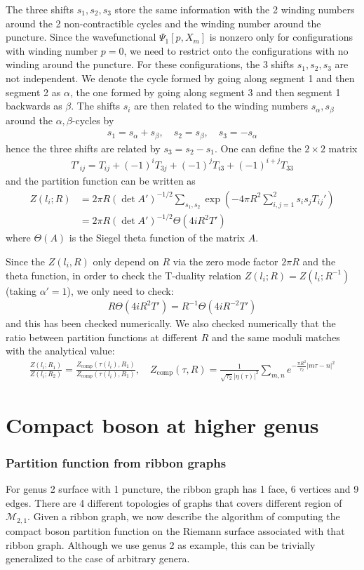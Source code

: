 \documentclass[12pt,letterpaper]{article}
\def\ie{\begin{equation}\begin{aligned}}
\def\fe{\end{aligned}\end{equation}}
\numberwithin{equation}{section}
\begin{document}
The three shifts $s_1, s_2, s_3$ store the same information with the 2 winding numbers around the 2 non-contractible cycles and the winding number around the puncture. Since the wavefunctional $\Psi_1[p,X_m]$ is nonzero only for configurations with winding number $p=0$, we need to restrict onto the configurations with no winding around the puncture. For these configurations, the 3 shifts $s_1, s_2, s_3$ are not independent. We denote the cycle formed by going along segment 1 and then segment 2 as $\alpha$, the one formed by going along segment 3 and then segment 1 backwards as $\beta$. The shifts $s_i$ are then related to the winding numbers $s_\alpha, s_\beta$ around the $\alpha, \beta$-cycles by
\ie
s_1=s_\alpha+s_\beta,\quad s_2=s_\beta, \quad s_3=-s_\alpha
\fe
hence the three shifts are related by $s_3=s_2-s_1$. One can define the $2\times 2$ matrix
\ie
T'_{ij}=T_{ij}+(-1)^i T_{3j}+(-1)^j T_{i3}+(-1)^{i+j} T_{33}
\fe
and the partition function can be written as
\ie
Z(l_i;R)&=2\pi R(\det A')^{-1/2}\sum_{s_1, s_2}\exp(-4\pi R^2\sum_{i,j=1}^2s_is_j T_{ij}')\\
&=2\pi R(\det A')^{-1/2}\Theta(4iR^2 T')
\fe
where $\Theta(A)$ is the Siegel theta function of the matrix $A$. 

Since the $Z(l_i, R)$ only depend on $R$ via the zero mode factor $2\pi R$ and the theta function, in order to check the T-duality relation $Z(l_i;R)=Z(l_i;R^{-1})$ (taking $\alpha'=1$), we only need to check:
\ie
R\Theta(4i R^2 T')= R^{-1}\Theta(4i R^{-2} T')
\fe
and this has been checked numerically. We also checked numerically that the ratio between partition functions at different $R$ and the same moduli matches with the analytical value:
\ie
\frac{Z(l_i; R_1)}{Z(l_i;R_2)}=\frac{Z_\text{comp}(\tau(l_i),R_1)}{Z_\text{comp}(\tau(l_i),R_1)},\quad Z_\text{comp}(\tau, R)=\frac{1}{\sqrt{\tau_2}|\eta(\tau)|^2}\sum_{m,n}e^{-\frac{\pi R^2}{\tau_2}|m\tau-n|^2}
\fe

\section{Compact boson at higher genus}

\subsubsection*{Partition function from ribbon graphs}

For genus 2 surface with 1 puncture, the ribbon graph has 1 face, 6 vertices and 9 edges. There are 4 different topologies of graphs that covers different region of $\mathcal{M}_{2,1}$. Given a ribbon graph, we now describe the algorithm of computing the compact boson partition function on the Riemann surface associated with that ribbon graph. Although we use genus 2 as example, this can be trivially generalized to the case of arbitrary genera.
\end{document}
